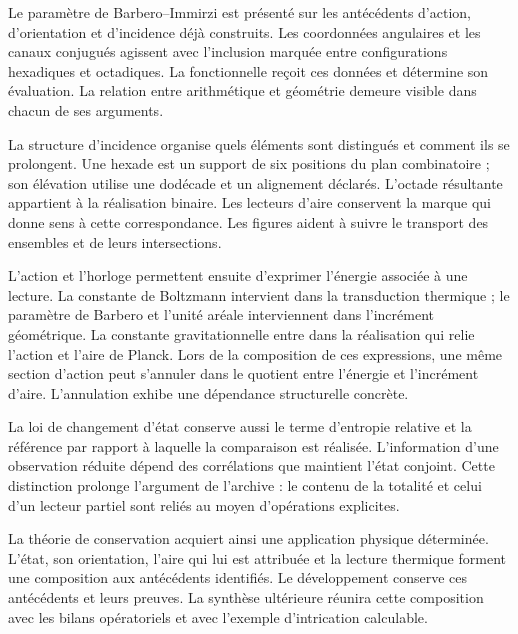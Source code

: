 
Le paramètre de Barbero--Immirzi est présenté sur les antécédents
d’action, d’orientation et d’incidence déjà construits. Les coordonnées
angulaires et les canaux conjugués agissent avec l’inclusion
marquée entre configurations hexadiques et octadiques. La fonctionnelle
reçoit ces données et détermine son évaluation. La relation entre
arithmétique et géométrie demeure visible dans chacun de ses arguments.

La structure d'incidence organise quels éléments sont distingués et comment ils se prolongent. Une hexade est un support de six positions du plan combinatoire ; son élévation utilise une dodécade et un alignement déclarés. L'octade résultante appartient à la réalisation binaire. Les lecteurs d'aire conservent la marque qui donne sens à cette correspondance. Les figures aident à suivre le transport des ensembles et de leurs intersections.

L’action et l’horloge permettent ensuite d’exprimer l’énergie associée
à une lecture. La constante de Boltzmann intervient dans la transduction
thermique ; le paramètre de Barbero et l’unité aréale interviennent dans
l’incrément géométrique. La constante gravitationnelle entre dans la
réalisation qui relie l’action et l’aire de Planck. Lors de la composition de ces
expressions, une même section d’action peut s’annuler dans le
quotient entre l’énergie et l’incrément d’aire. L’annulation exhibe
une dépendance structurelle concrète.

La loi de changement d’état conserve aussi le terme d’entropie
relative et la référence par rapport à laquelle la comparaison est réalisée.
L’information d’une observation réduite dépend des corrélations
que maintient l’état conjoint. Cette distinction prolonge l’argument
de l’archive : le contenu de la totalité et celui d’un lecteur partiel
sont reliés au moyen d’opérations explicites.

La théorie de conservation acquiert ainsi une application physique déterminée. L'état, son orientation, l'aire qui lui est attribuée et la lecture thermique forment une composition aux antécédents identifiés. Le développement conserve ces antécédents et leurs preuves. La synthèse ultérieure réunira cette composition avec les bilans opératoriels et avec l'exemple d'intrication calculable.

